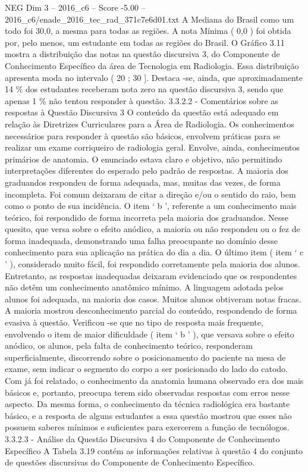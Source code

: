\begin{textsample}{NEG Dim 3 – 2016\_c6 – Score -5.00 – 2016\_c6/enade\_2016\_tec\_rad\_371c7e6d01.txt}
A Mediana do Brasil como um todo foi 30,0, a mesma para todas as regiões.
A nota Mínima ( 0,0 ) foi obtida por, pelo menos, um estudante em todas as regiões do Brasil.
O Gráfico 3.11 mostra a distribuição das notas na questão discursiva 3, do Componente de Conhecimento Específico da área de Tecnologia em Radiologia.
Essa distribuição apresenta moda no intervalo ( 20 ; 30 ].
Destaca -se, ainda, que aproximadamente 14 \% dos estudantes receberam nota zero na questão discursiva 3, sendo que apenas 1 \% não tentou responder à questão. 3.3.2.2 - Comentários sobre as respostas à Questão Discursiva 3 O conteúdo da questão está adequado em relação às Diretrizes Curriculares para a Área de Radiologia.
Os conhecimentos necessários para responder à questão são básicos, envolvem práticas para se realizar um exame corriqueiro de radiologia geral.
Envolve, ainda, conhecimentos primários de anatomia.
O enunciado estava claro e objetivo, não permitindo interpretações diferentes do esperado pelo padrão de respostas.
A maioria dos graduandos respondeu de forma adequada, mas, muitas das vezes, de forma incompleta.
Foi comum deixaram de citar a direção e/ou o sentido do raio, bem como o ponto de sua incidência.
O item ‘ b ’, referente a um conhecimento mais teórico, foi respondido de forma incorreta pela maioria dos graduandos.
Nesse quesito, que versa sobre o efeito anódico, a maioria ou não respondeu ou o fez de forma inadequada, demonstrando uma falha preocupante no domínio desse conhecimento para sua aplicação na prática do dia a dia.
O último item ( item ‘ c ’ ), considerado muito fácil, foi respondido corretamente pela maioria dos alunos.
Entretanto, as respostas inadequadas deixaram evidenciado que os respondentes não detêm um conhecimento anatômico mínimo.
A linguagem adotada pelos alunos foi adequada, na maioria dos casos.
Muitos alunos obtiveram notas fracas.
A maioria mostrou desconhecimento parcial do conteúdo, respondendo de forma evasiva à questão.
Verificou -se que no tipo de resposta mais frequente, envolvendo o item de maior dificuldade ( item ‘ b ’ ), que versava sobre o efeito anódico, os alunos, pela falta de conhecimento teórico, responderam superficialmente, discorrendo sobre o posicionamento do paciente na mesa de exame, sem indicar o segmento do corpo a ser posicionado do lado do catodo.
Com já foi relatado, o conhecimento da anatomia humana observado era dos mais básicos e, portanto, preocupa terem sido observadas respostas com erros nesse aspecto.
Da mesma forma, o conhecimento da técnica radiológica era bastante básico, e a resposta de alguns estudantes a essa questão mostrou que esses não possuem saberes mínimos e suficientes para exercerem a função de tecnólogos. 3.3.2.3 - Análise da Questão Discursiva 4 do Componente de Conhecimento Específico A Tabela 3.19 contém as informações relativas à questão 4 do conjunto de questões discursivas do Componente de Conhecimento Específico.

\end{textsample}
